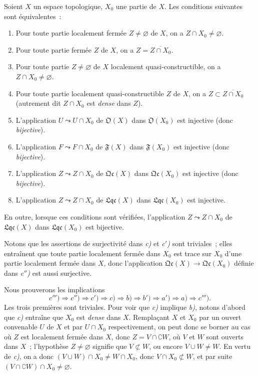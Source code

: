 \begin{proposition}[10.1.2]
\label{IV.10.1.2-fr}
Soient $X$ un espace topologique, $X_0$ une partie de $X$. Les conditions
suivantes sont équivalentes~:
\begin{enumerate}[label=\emph{\alph*)}]
  \item Pour toute partie localement fermée $Z\neq\varnothing$ de $X$, on a
  $Z\cap X_0\neq\varnothing$.
  \item[\emph{a$'$)}] Pour toute partie fermée $Z$ de $X$, on a
  $Z=\overline{Z\cap X_0}$.
  \item Pour toute partie $Z\neq\varnothing$ de $X$ localement
  quasi-constructible, on a $Z\cap X_0\neq\varnothing$.
  \item[\emph{b$'$)}] Pour toute partie localement quasi-constructible $Z$ de
  $X$, on a $Z\subset\overline{Z\cap X_0}$ \textup{(autrement dit $Z\cap X_0$ est
  \emph{dense} dans $Z$)}.
  \item L'application $U\leadsto U\cap X_0$ de $\mathfrak O(X)$ dans
  $\mathfrak O(X_0)$ est injective \textup{(donc \emph{bijective})}.
  \item[\emph{c$'$)}] L'application $F\leadsto F\cap X_0$ de $\mathfrak F(X)$
  dans $\mathfrak F(X_0)$ est injective \textup{(donc \emph{bijective})}.
  \item[\emph{c$''$)}] L'application $Z\leadsto Z\cap X_0$ de
  $\mathfrak{Qc}(X)$ dans $\mathfrak{Qc}(X_0)$ est injective \textup{(donc \emph{bijective})}.
  \item[\emph{c$'''$)}] L'application $Z\leadsto Z\cap X_0$ de
  $\mathfrak{Lqc}(X)$ dans $\mathfrak{Lqc}(X_0)$ est injective.
\end{enumerate}
En outre, lorsque ces conditions sont vérifiées, l'application
$Z\leadsto Z\cap X_0$ de $\mathfrak{Lqc}(X)$ dans $\mathfrak{Lqc}(X_0)$ est
bijective.
\end{proposition}

Notons que les assertions de surjectivité dans \emph{c)} et \emph{c$'$)} sont
triviales~; elles entraînent que toute partie localement fermée dans $X_0$ est
trace sur $X_0$ d'une partie localement fermée dans $X$, donc l'application
$\mathfrak{Qc}(X)\to\mathfrak{Qc}(X_0)$ définie dans \emph{c$''$)} est aussi
surjective.

Nous prouverons les implications
\[
c''')\Rightarrow c'')\Rightarrow c')\Rightarrow c)\Rightarrow b)
\Rightarrow b')\Rightarrow a')\Rightarrow a)\Rightarrow c''').
\]
Les trois premières sont triviales. Pour voir que \emph{c)} implique
\emph{b)}, notons d'abord que \emph{c)} entraîne que $X_0$ est \emph{dense}
dans $X$. Remplaçant $X$ et $X_0$ par un ouvert convenable $U$ de $X$ et par
$U\cap X_0$ respectivement, on peut donc se borner au cas où $Z$ est
localement fermée dans $X$, donc $Z=V\cap\complement W$, où $V$ et $W$ sont
ouverts dans $X$~; l'hypothèse $Z\neq\varnothing$ signifie que
$V\not\subset W$, ou encore $V\cup W\neq W$. En vertu de \emph{c)}, on a donc
$(V\cup W)\cap X_0\neq W\cap X_0$, donc $V\cap X_0\not\subset W$, et par
suite $(V\cap\complement W)\cap X_0\neq\varnothing$.

